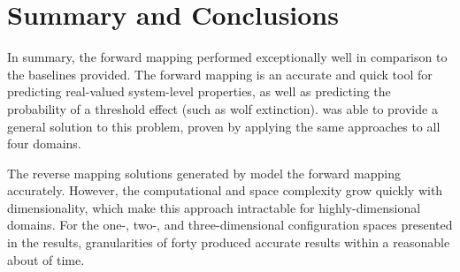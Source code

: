 \section{Summary and Conclusions}

In summary, the forward mapping performed exceptionally well in comparison to the baselines provided.
The forward mapping is an accurate and quick tool for predicting real-valued system-level properties, as well as predicting the probability of a threshold effect (such as wolf extinction).
\fw was able to provide a general solution to this problem, proven by applying the same approaches to all four domains.

The reverse mapping solutions generated by \fw model the forward mapping accurately.
However, the computational and space complexity grow quickly with dimensionality, which make this approach intractable for highly-dimensional domains.
For the one-, two-, and three-dimensional configuration spaces presented in the results, granularities of forty produced accurate results within a reasonable about of time.



